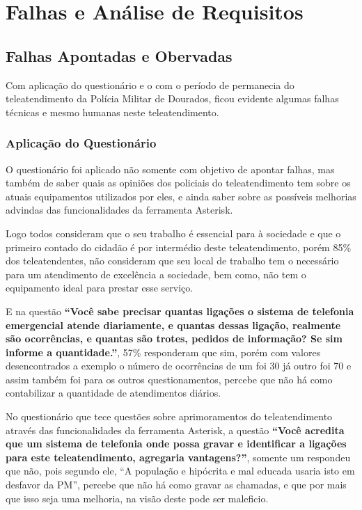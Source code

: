 
\chapter{Falhas e Análise de Requisitos} %
\section{Falhas Apontadas e Obervadas}
Com aplicação do questionário e o com o período de permanecia do teleatendimento da Polícia Militar de Dourados, ficou evidente algumas falhas técnicas e mesmo humanas neste teleatendimento.

\subsection{Aplicação do Questionário}
O questionário foi aplicado não somente com objetivo de apontar falhas, mas também de saber quais as opiniões dos policiais do teleatendimento tem sobre os atuais equipamentos utilizados por eles, e ainda saber sobre as possíveis melhorias advindas das funcionalidades da ferramenta Asterisk.

Logo todos consideram que o seu trabalho é essencial para à sociedade e que o
primeiro contado do cidadão é por intermédio deste teleatendimento, porém 85\% dos teleatendentes, não consideram que seu  local de trabalho tem o necessário para um atendimento de excelência a sociedade, bem como, não tem o equipamento ideal para prestar esse serviço.

E na questão \textbf{``Você sabe precisar quantas ligações o sistema de telefonia emergencial atende diariamente, e quantas dessas ligação, realmente são ocorrências, e quantas são trotes, pedidos de informação? Se sim informe a quantidade.''}, 57\% responderam que sim, porém com valores desencontrados a exemplo o número de ocorrências de um foi 30 já outro foi 70 e assim também foi para os outros questionamentos, percebe que não há como contabilizar a quantidade de atendimentos diários.

No questionário que tece questões sobre aprimoramentos do teleatendimento através das funcionalidades da ferramenta Asterisk, a questão \textbf{``Você acredita que um sistema de telefonia onde possa gravar e identificar a ligações para este teleatendimento, agregaria vantagens?''}, somente um respondeu que não, pois segundo ele, “A população e hipócrita e mal educada usaria isto em desfavor da PM”, percebe que não há como gravar as chamadas, e que por mais que isso seja uma melhoria, na visão deste pode ser maleficio.

